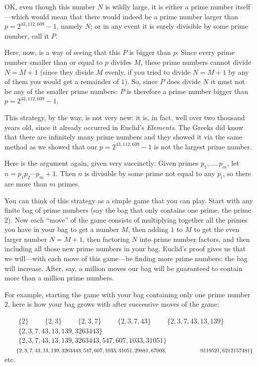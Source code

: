 \documentclass[openany]{book}
\theoremstyle{plain}
\theoremstyle{definition}
\begin{document}
OK, even though this number $N$ is wildly large, it is either a prime
number itself---which would mean that there would indeed be a prime
number larger than $p=2^{43,112,609} - 1$, namely $N$; or in any event it is
surely divisible by some prime number, call it $P$.

Here, now, is a way of seeing that this $P$ is bigger than $p$: Since
every prime number smaller than or equal to $p$ divides $M$, these
prime numbers cannot divide $N= M+1$ (since they divide $M$ evenly, if
you tried to divide $N=M+1$ by any of them you would get a remainder
of $1$).  So, since $P$ does divide $N$ it must not be any of the
smaller prime numbers: $P$ is therefore a prime number bigger than $p=
2^{43,112,609}-1$.

This strategy, by the way, is not very new: it is, in fact, well over
two thousand years old, since it already occurred in Euclid's {\em
  Elements}. The Greeks did know that there are infinitely many prime
numbers and they showed it via the same method as we showed that our
$p = 2^{43,112,609} - 1$ is not the largest prime number.

Here is the argument again, given very succinctly:
Given primes $p_1, \ldots, p_m$, let $n=p_1 p_2 \cdots p_m +
1$.  Then $n$ is divisible by some prime not equal to any $p_i$,
so there are more than $m$ primes.

You can think of this strategy as a simple game that you can
play. Start with any finite bag of prime numbers (say the bag that
only contains one prime, the prime $2$). Now each ``move'' of the game
consists of multiplying together all the primes you have in your bag
to get a number $M$, then adding $1$ to $M$ to get the even larger
number $N=M+1$, then factoring $N$ into prime number factors, and then
including all those new prime numbers in your bag. Euclid's proof
gives us that we will---with each move of this game---be finding more
prime numbers: the bag will increase. After, say, a million moves our
bag will be guaranteed to contain more than a million prime numbers.

For example, starting the game with your bag containing
only one prime number $2$, here is how your bag grows with after
successive moves of the game:

$\mbox{}\qquad\{2\}$
\newline
$\mbox{}\qquad\{2,3\}$
\newline
$\mbox{}\qquad\{2,3, 7\}$
\newline
$\mbox{}\qquad\{2,3, 7, 43\}$
\newline
$\mbox{}\qquad\{2,3, 7, 43, 13, 139\}$
\newline
$\mbox{}\qquad\{2,3, 7, 43, 13, 139, 3263443\}$
\newline
$\mbox{}\qquad\{2,3, 7, 43, 13, 139, 3263443,  547, 607, 1033, 31051\}$
\newline
$\mbox{}\qquad\{2,3, 7, 43, 13, 139, 3263443,  547, 607, 1033, 31051, 29881, 67003,\\
\mbox{}\qquad\qquad\qquad 9119521, 6212157481\}$
\newline
\mbox{}\qquad{}etc. 
\end{document}
